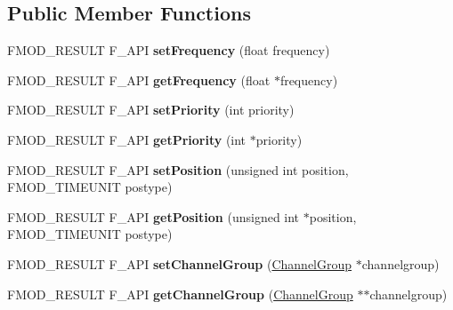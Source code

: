 \subsection*{Public Member Functions}
\begin{DoxyCompactItemize}
\item 
\mbox{\label{classFMOD_1_1Channel_a355cd052a405c0ecdbaac7c65d24148b}} 
F\+M\+O\+D\+\_\+\+R\+E\+S\+U\+LT F\+\_\+\+A\+PI {\bfseries set\+Frequency} (float frequency)
\item 
\mbox{\label{classFMOD_1_1Channel_a99f1dcf4b2a67f509d08f138e9e3cbca}} 
F\+M\+O\+D\+\_\+\+R\+E\+S\+U\+LT F\+\_\+\+A\+PI {\bfseries get\+Frequency} (float $\ast$frequency)
\item 
\mbox{\label{classFMOD_1_1Channel_a83a9a2f49e4bdde446f0d574847f5329}} 
F\+M\+O\+D\+\_\+\+R\+E\+S\+U\+LT F\+\_\+\+A\+PI {\bfseries set\+Priority} (int priority)
\item 
\mbox{\label{classFMOD_1_1Channel_ae2a16710e706c0223937bc99fb3cad3d}} 
F\+M\+O\+D\+\_\+\+R\+E\+S\+U\+LT F\+\_\+\+A\+PI {\bfseries get\+Priority} (int $\ast$priority)
\item 
\mbox{\label{classFMOD_1_1Channel_a46f8f6738b500bbb995bd4a4ecce826f}} 
F\+M\+O\+D\+\_\+\+R\+E\+S\+U\+LT F\+\_\+\+A\+PI {\bfseries set\+Position} (unsigned int position, F\+M\+O\+D\+\_\+\+T\+I\+M\+E\+U\+N\+IT postype)
\item 
\mbox{\label{classFMOD_1_1Channel_a580cb740f80cf139faaf21181490d98f}} 
F\+M\+O\+D\+\_\+\+R\+E\+S\+U\+LT F\+\_\+\+A\+PI {\bfseries get\+Position} (unsigned int $\ast$position, F\+M\+O\+D\+\_\+\+T\+I\+M\+E\+U\+N\+IT postype)
\item 
\mbox{\label{classFMOD_1_1Channel_a570b83eb8178325a131b081a8d5ffd81}} 
F\+M\+O\+D\+\_\+\+R\+E\+S\+U\+LT F\+\_\+\+A\+PI {\bfseries set\+Channel\+Group} (\hyperlink{classFMOD_1_1ChannelGroup}{Channel\+Group} $\ast$channelgroup)
\item 
\mbox{\label{classFMOD_1_1Channel_a4b6d310d04eb844190db7a4074af2b2c}} 
F\+M\+O\+D\+\_\+\+R\+E\+S\+U\+LT F\+\_\+\+A\+PI {\bfseries get\+Channel\+Group} (\hyperlink{classFMOD_1_1ChannelGroup}{Channel\+Group} $\ast$$\ast$channelgroup)
$$
\end{DoxyCompactItemize}
